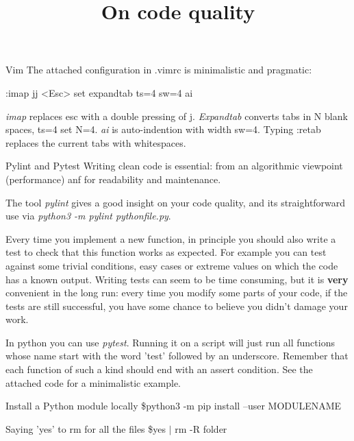 \documentclass[10pt]{article}
\title {On code quality}
\begin{document}
\maketitle

\begin{section}{Vim}
The attached configuration in .vimrc is minimalistic and pragmatic:


:imap jj <Esc>
set expandtab ts=4 sw=4 ai


\emph{imap} replaces esc with a double pressing of j.
\emph{Expandtab} converts tabs in N blank spaces, ts=4 set N=4.
\emph{ai} is auto-indention with width sw=4.
Typing :retab replaces the current tabs
with whitespaces.
\end{section}


\begin{section}{Pylint and Pytest}
Writing clean code is essential: from an algorithmic viewpoint 
(performance) anf for readability and maintenance.


The tool \emph{pylint} gives a good insight on your code quality,
and its straightforward use via \emph{python3 -m pylint pythonfile.py}.


Every time you implement a new function, 
in principle you should also
write a test to check that this function works as expected.
For example you can test against some trivial conditions, easy
cases or extreme values on which the code has a known output.
Writing tests can seem to be time consuming, but it is
\textbf{very} 
convenient in the long run: every time you modify some parts of your code,
if the tests are still successful, you have some chance to believe you didn't
damage your work.


In python you can use \emph{pytest}. Running it on a script will just run
all functions whose name start with the word 'test' followed by an underscore.
Remember that each function of such a kind should end with an assert condition.
See the attached code for a minimalistic example.
\end{section}

\begin{section}{Install a Python module locally}
\$python3 -m pip install --user MODULENAME
\end{section}

\begin{section}{Saying 'yes' to rm for all the files}
\$yes $|$ rm -R folder
\end{section}
\end{document}
